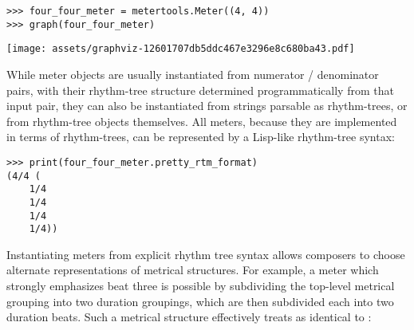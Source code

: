 \begin{comment}
<abjad>
four_four_meter = metertools.Meter((4, 4))
graph(four_four_meter)
</abjad>
\end{comment}

\begin{abjadbookoutput}
\begin{singlespacing}
\vspace{-0.5\baselineskip}
\begin{verbatim}
>>> four_four_meter = metertools.Meter((4, 4))
>>> graph(four_four_meter)
\end{verbatim}
\noindent\texttt{[image: assets/graphviz-12601707db5ddc467e3296e8c680ba43.pdf]}
\end{singlespacing}
\end{abjadbookoutput}

\noindent While meter objects are usually instantiated from numerator /
denominator pairs, with their rhythm-tree structure determined programmatically
from that input pair, they can also be instantiated from strings parsable as
rhythm-trees, or from rhythm-tree objects themselves. All meters, because they
are implemented in terms of rhythm-trees, can be represented by a Lisp-like
rhythm-tree syntax:

\begin{comment}
<abjad>
print(four_four_meter.pretty_rtm_format)
</abjad>
\end{comment}

\begin{abjadbookoutput}
\begin{singlespacing}
\vspace{-0.5\baselineskip}
\begin{verbatim}
>>> print(four_four_meter.pretty_rtm_format)
(4/4 (
	1/4
	1/4
	1/4
	1/4))
\end{verbatim}
\end{singlespacing}
\end{abjadbookoutput}

\noindent Instantiating meters from explicit rhythm tree syntax allows
composers to choose alternate representations of metrical structures. For
example, a  meter which strongly emphasizes beat three is possible
by subdividing the top-level  metrical grouping into two
 duration groupings, which are then subdivided each into two
 duration beats. Such a metrical structure effectively treats
 as identical to :

